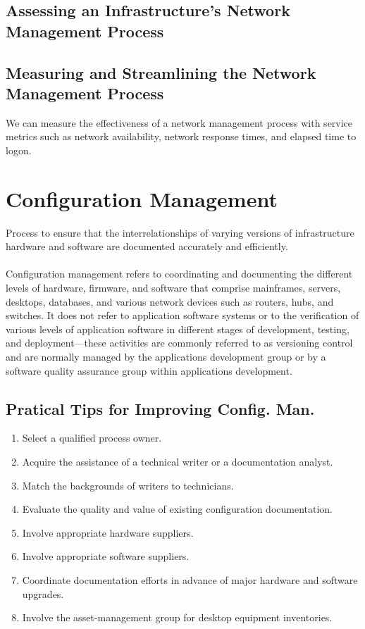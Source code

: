 \documentclass[8pt]{extarticle}
\begin{document}
\begin{multicols}{3}
\subsection{Assessing an Infrastructure’s Network Management Process}
\subsection{Measuring and Streamlining the Network Management Process}
We can measure the effectiveness of a network management process with service metrics such as network availability, 
network response times, and elapsed time to logon.

\section{Configuration Management}
Process to ensure that the interrelationships of varying versions of infrastructure hardware and software are
documented accurately and efficiently. \\
\\
Configuration management refers to coordinating and documenting the different levels of hardware, firmware, and 
software that comprise mainframes, servers, desktops, databases, and various network devices such as routers, hubs,
and switches. It does not refer to application software systems or to the verification of various levels of application
software in different stages of development, testing, and deployment—these activities are commonly referred to as
versioning control and are normally managed by the applications development group or by a software quality assurance 
group within applications development.

\subsection{Pratical Tips for Improving Config. Man.}
\begin{enumerate}
    \item Select a qualified process owner.
    \item Acquire the assistance of a technical writer or a documentation analyst.
    \item Match the backgrounds of writers to technicians.
    \item Evaluate the quality and value of existing configuration documentation.
    \item Involve appropriate hardware suppliers.
    \item Involve appropriate software suppliers.
    \item Coordinate documentation efforts in advance of major hardware and software upgrades.
    \item Involve the asset-management group for desktop equipment inventories.
\end{enumerate}


\end{multicols}
\end{document}
